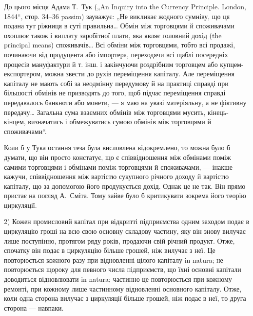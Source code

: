 До цього місця Адама Т.~Тук („An Inquiry into the Currency Principle.
London, 1844“, стор. 34--36 passim) зауважує: „Не викликає жодного
сумніву, що ця подана тут ріжниця в суті правильна\dots{} Обмін між торговцями
й споживачами охоплює також і виплату заробітної плати, яка
являє головний дохід (the principal means) споживачів\dots{} Всі обміни між
торговцями, тобто всі продажі, починаючи від продуцента або імпортера,
переходячи всі щаблі посередніх процесів мануфактури й т. інш. і закінчуючи
роздрібним торговцем або купцем-експортером, можна звести
до рухів переміщення капіталу. Але переміщення капіталу не мають собі
за неодмінну передумову й на практиці справді при більшості обмінів не
призводять до того, щоб підчас переміщення справді передавалось банкноти
або монети, — я маю на увазі матеріяльну, а не фіктивну передачу\dots{}
Загальна сума взаємних обмінів між торговцями мусить, кінець-кінцем,
визначатись і обмежуватись сумою обмінів між торговцями й споживачами“.

Коли б у Тука остання теза була висловлена відокремлено, то можна
було б думати, що він просто констатує, що є співвідношення між обмінами
поміж самими торговцями і обмінами поміж торговцями й споживачами, —
інакше кажучи, співвідношення між вартістю сукупного річного доходу й
вартістю капіталу, що за допомогою його продукується дохід. Однак це
не так. Він прямо пристає на погляд А.~Сміта. Тому зайве було б
критикувати зокрема його теорію циркуляції.

2) Кожен промисловий капітал при відкритті підприємства одним заходом
подає в циркуляцію гроші на всю свою основну складову частину, яку
він знову вилучає лише поступінно, протягом ряду років, продаючи свій
річний продукт. Отже, спочатку він подає в циркуляцію більше грошей,
ніж вилучає з неї. Це повторюється кожного разу при відновленні цілого
капіталу in natura; не повторюється щороку для певного числа підприємств,
що їхні основні капітали доводиться відновлювати in natura; частинно
це повторюється при кожному ремонті, при кожному лише частинному
відновленні основного капіталу. Отже, коли одна сторона
вилучає з циркуляції більше грошей, ніж подає в неї, то друга сторона —
навпаки.

